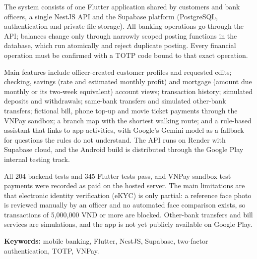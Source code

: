 The system consists of one Flutter application shared by customers and bank officers, a single NestJS API and the Supabase platform (PostgreSQL, authentication and private file storage). All banking operations go through the API; balances change only through narrowly scoped posting functions in the database, which run atomically and reject duplicate posting. Every financial operation must be confirmed with a TOTP code bound to that exact operation.

Main features include officer-created customer profiles and requested edits; checking, savings (rate and estimated monthly profit) and mortgage (amount due monthly or its two-week equivalent) account views; transaction history; simulated deposits and withdrawals; same-bank transfers and simulated other-bank transfers; fictional bill, phone top-up and movie ticket payments through the VNPay sandbox; a branch map with the shortest walking route; and a rule-based assistant that links to app activities, with Google's Gemini model as a fallback for questions the rules do not understand. The API runs on Render with Supabase cloud, and the Android build is distributed through the Google Play internal testing track.

All 204 backend tests and 345 Flutter tests pass, and VNPay sandbox test payments were recorded as paid on the hosted server. The main limitations are that electronic identity verification (eKYC) is only partial: a reference face photo is reviewed manually by an officer and no automated face comparison exists, so transactions of 5,000,000 VND or more are blocked. Other-bank transfers and bill services are simulations, and the app is not yet publicly available on Google Play.

\textbf{Keywords:} mobile banking, Flutter, NestJS, Supabase, two-factor authentication, TOTP, VNPay.

